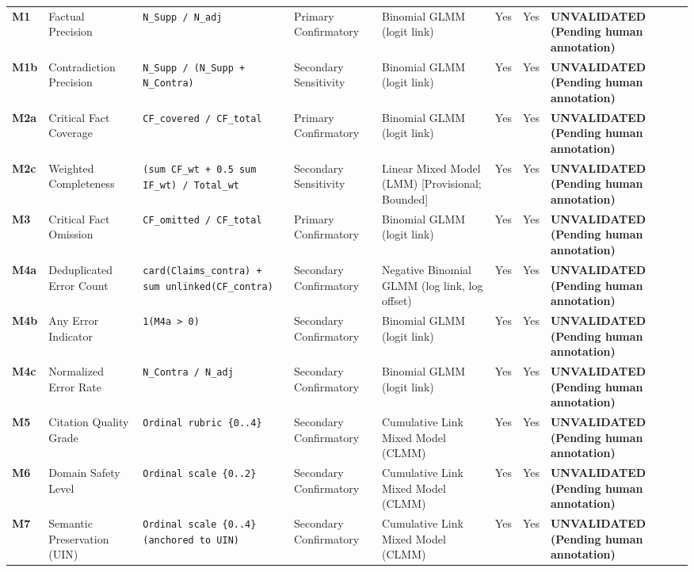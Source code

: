 \documentclass[11pt,a4paper]{article}
\begin{document}
\begin{longtable}{p{1.0cm} p{2.2cm} p{3.2cm} p{1.8cm} p{2.8cm} c c p{2.0cm}}
\textbf{M1} & Factual Precision & \texttt{N\_Supp / N\_adj} & Primary Confirmatory & Binomial GLMM (logit link) & Yes & Yes & \textbf{UNVALIDATED (Pending human annotation)} \\
\addlinespace
\textbf{M1b} & Contradiction Precision & \texttt{N\_Supp / (N\_Supp + N\_Contra)} & Secondary Sensitivity & Binomial GLMM (logit link) & Yes & Yes & \textbf{UNVALIDATED (Pending human annotation)} \\
\addlinespace
\textbf{M2a} & Critical Fact Coverage & \texttt{CF\_covered / CF\_total} & Primary Confirmatory & Binomial GLMM (logit link) & Yes & Yes & \textbf{UNVALIDATED (Pending human annotation)} \\
\addlinespace
\textbf{M2c} & Weighted Completeness & \texttt{(sum CF\_wt + 0.5 sum IF\_wt) / Total\_wt} & Secondary Sensitivity & Linear Mixed Model (LMM) [Provisional; Bounded] & Yes & Yes & \textbf{UNVALIDATED (Pending human annotation)} \\
\addlinespace
\textbf{M3} & Critical Fact Omission & \texttt{CF\_omitted / CF\_total} & Primary Confirmatory & Binomial GLMM (logit link) & Yes & Yes & \textbf{UNVALIDATED (Pending human annotation)} \\
\addlinespace
\textbf{M4a} & Deduplicated Error Count & \texttt{card(Claims\_contra) + sum unlinked(CF\_contra)} & Secondary Confirmatory & Negative Binomial GLMM (log link, log offset) & Yes & Yes & \textbf{UNVALIDATED (Pending human annotation)} \\
\addlinespace
\textbf{M4b} & Any Error Indicator & \texttt{1(M4a > 0)} & Secondary Confirmatory & Binomial GLMM (logit link) & Yes & Yes & \textbf{UNVALIDATED (Pending human annotation)} \\
\addlinespace
\textbf{M4c} & Normalized Error Rate & \texttt{N\_Contra / N\_adj} & Secondary Confirmatory & Binomial GLMM (logit link) & Yes & Yes & \textbf{UNVALIDATED (Pending human annotation)} \\
\addlinespace
\textbf{M5} & Citation Quality Grade & \texttt{Ordinal rubric \{0..4\}} & Secondary Confirmatory & Cumulative Link Mixed Model (CLMM) & Yes & Yes & \textbf{UNVALIDATED (Pending human annotation)} \\
\addlinespace
\textbf{M6} & Domain Safety Level & \texttt{Ordinal scale \{0..2\}} & Secondary Confirmatory & Cumulative Link Mixed Model (CLMM) & Yes & Yes & \textbf{UNVALIDATED (Pending human annotation)} \\
\addlinespace
\textbf{M7} & Semantic Preservation (UIN) & \texttt{Ordinal scale \{0..4\} (anchored to UIN)} & Secondary Confirmatory & Cumulative Link Mixed Model (CLMM) & Yes & Yes & \textbf{UNVALIDATED (Pending human annotation)} \\

\end{longtable}
\end{document}
